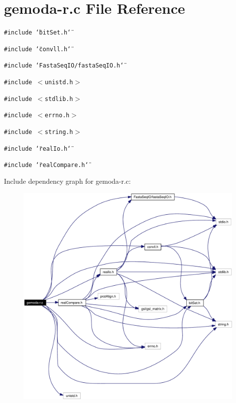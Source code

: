 \hypertarget{gemoda-r_8c}{
\section{gemoda-r.c File Reference}
\label{gemoda-r_8c}
}
{\tt \#include \char`\"{}bit\-Set.h\char`\"{}}\par
{\tt \#include \char`\"{}convll.h\char`\"{}}\par
{\tt \#include \char`\"{}Fasta\-Seq\-IO/fasta\-Seq\-IO.h\char`\"{}}\par
{\tt \#include $<$unistd.h$>$}\par
{\tt \#include $<$stdlib.h$>$}\par
{\tt \#include $<$errno.h$>$}\par
{\tt \#include $<$string.h$>$}\par
{\tt \#include \char`\"{}real\-Io.h\char`\"{}}\par
{\tt \#include \char`\"{}real\-Compare.h\char`\"{}}\par


Include dependency graph for gemoda-r.c:\begin{figure}[H]
\begin{center}
\leavevmode
\includegraphics[width=334pt]{gemoda-r_8c__incl}
\end{center}
\end{figure}
